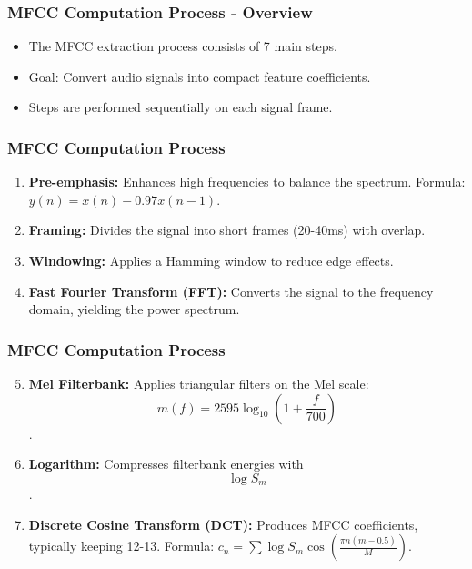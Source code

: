 \begin{frame}
    \frametitle{MFCC Computation Process - Overview}
    \begin{itemize}
        \item The MFCC extraction process consists of 7 main steps.
        \item Goal: Convert audio signals into compact feature coefficients.
        \item Steps are performed sequentially on each signal frame.
    \end{itemize}
\end{frame}
\begin{frame}
\frametitle{MFCC Computation Process}
    \begin{enumerate}
        \item \textbf{Pre-emphasis:} Enhances high frequencies to balance the spectrum. Formula: \( y(n) = x(n) - 0.97 x(n-1) \).
        \item \textbf{Framing:} Divides the signal into short frames (20-40ms) with overlap.
        \item \textbf{Windowing:} Applies a Hamming window to reduce edge effects.
        \item \textbf{Fast Fourier Transform (FFT):} Converts the signal to the frequency domain, yielding the power spectrum.
    \end{enumerate}
\end{frame}

\begin{frame}
    \frametitle{MFCC Computation Process}
    \begin{enumerate}
        \setcounter{enumi}{4}
        \item \textbf{Mel Filterbank:} Applies triangular filters on the Mel scale: $$ m(f) = 2595 \log_{10}(1 + \frac{f}{700}) $$.
        \item \textbf{Logarithm:} Compresses filterbank energies with $$ \log S_m $$.
        \item \textbf{Discrete Cosine Transform (DCT):} Produces MFCC coefficients, typically keeping 12-13. Formula: \( c_n = \sum \log S_m \cos\left(\frac{\pi n (m-0.5)}{M}\right) \).
    \end{enumerate}
\end{frame}

